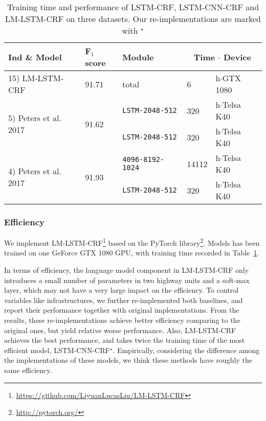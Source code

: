 \documentclass[letterpaper]{article} \usepackage{aaai18}  \usepackage{times}  \usepackage{helvet}  \usepackage{courier}  \usepackage{url}  \usepackage{graphicx}  \usepackage{multirow}
\newcommand{\our}{\textsc{LM-LSTM-CRF}\xspace}
\begin{document}
\begin{table}
\center
\scalebox{0.65}
{
\begin{tabular}{l|l|l|l l}
\hline
Ind \& Model & F$_1$score & Module &\multicolumn{2}{|c}{Time $\cdot$ Device}\\
\hline
\hline
15) \our & 91.71 & total & 6 &h$\cdot$GTX 1080\\
\hline
\multirow{2}{*}{5) Peters et al. 2017} & \multirow{2}{*}{91.62} & \texttt{LSTM-2048-512} & 320 & h$\cdot$Telsa K40\\
\cline{3-5}
& & \texttt{LSTM-2048-512}& 320 &h$\cdot$Telsa K40\\
\hline
\multirow{2}{*}{4) Peters et al. 2017} & \multirow{2}{*}{91.93} & \texttt{4096-8192-1024} & 14112 &h$\cdot$Telsa K40\\
\cline{3-5}
& & \texttt{LSTM-2048-512}& 320 &h$\cdot$Telsa K40\\
\hline
\end{tabular}
}
\caption{Training time and performance of LSTM-CRF, LSTM-CNN-CRF and \our on three datasets. Our re-implementations are marked with $^\star$}\label{tbl:eff1}
\end{table}


    \subsubsection{Efficiency}

    We implement LM-LSTM-CRF\footnote{\url{https://github.com/LiyuanLucasLiu/LM-LSTM-CRF}} based on the PyTorch library\footnote{\url{http://pytorch.org/}}. 
    Models has been trained on one GeForce GTX 1080 GPU, with training time recorded in Table~\ref{tbl:eff1}.

    In terms of efficiency, the language model component in \our only introduces a small number of parameters in two highway units and a soft-max layer, which may not have a very large impact on the efficiency.
    To control variables like infrastructures, we further re-implemented both baselines, and report their performance together with original implementations.
    From the results, these re-implementations achieve better efficiency comparing to the original ones, but yield relative worse performance.
    Also, \our achieves the best performance, and takes twice the training time of the most efficient model, LSTM-CNN-CRF$^\star$.
    Empirically, considering the difference among the implementations of these models, we think these methods have roughly the same efficiency.
    
\end{document}
